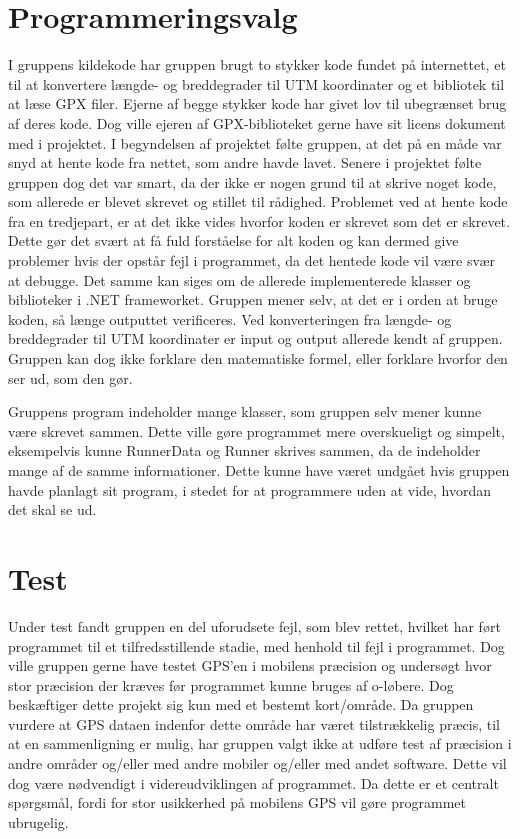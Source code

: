 \section{Programmeringsvalg}
I gruppens kildekode har gruppen brugt to stykker kode fundet på internettet, et til at konvertere længde- og breddegrader til UTM koordinater og et bibliotek til at læse GPX filer. Ejerne af begge stykker kode har givet lov til ubegrænset brug af deres kode. Dog ville ejeren af GPX-biblioteket gerne have sit licens dokument med i projektet. I begyndelsen af projektet følte gruppen, at det på en måde var snyd at hente kode fra nettet, som andre havde lavet. Senere i projektet følte gruppen dog det var smart, da der ikke er nogen grund til at skrive noget kode, som allerede er blevet skrevet og stillet til rådighed. \newline
Problemet ved at hente kode fra en tredjepart, er at det ikke vides hvorfor koden er skrevet som det er skrevet. Dette gør det svært at få fuld forståelse for alt koden og kan dermed give problemer hvis der opstår fejl i programmet, da det hentede kode vil være svær at debugge. Det samme kan siges om de allerede implementerede klasser og biblioteker i .NET frameworket. Gruppen mener selv, at det er i orden at bruge koden, så længe outputtet verificeres.\newline
Ved konverteringen fra længde- og breddegrader til UTM koordinater er input og output allerede kendt af gruppen. Gruppen kan dog ikke forklare den matematiske formel, eller forklare hvorfor den ser ud, som den gør. 

Gruppens program indeholder mange klasser, som gruppen selv mener kunne være skrevet sammen. Dette ville gøre programmet mere overskueligt og simpelt, eksempelvis kunne RunnerData og Runner skrives sammen, da de indeholder mange af de samme informationer. Dette kunne have været undgået hvis gruppen havde planlagt sit program, i stedet for at programmere uden at vide, hvordan det skal se ud. 

\section{Test}
Under test fandt gruppen en del uforudsete fejl, som blev rettet, hvilket har ført programmet til et tilfredsstillende stadie, med henhold til fejl i programmet. Dog ville gruppen gerne have testet GPS’en i mobilens præcision og undersøgt hvor stor præcision der kræves før programmet kunne bruges af o-løbere. Dog beskæftiger dette projekt sig kun med et bestemt kort/område. Da gruppen vurdere at GPS dataen indenfor dette område har været tilstrækkelig præcis, til at en sammenligning er mulig, har gruppen valgt ikke at udføre test af præcision i andre områder og/eller med andre mobiler og/eller med andet software. Dette vil dog være nødvendigt i videreudviklingen af programmet. Da dette er et centralt spørgsmål, fordi for stor usikkerhed på mobilens GPS vil gøre programmet ubrugelig.
